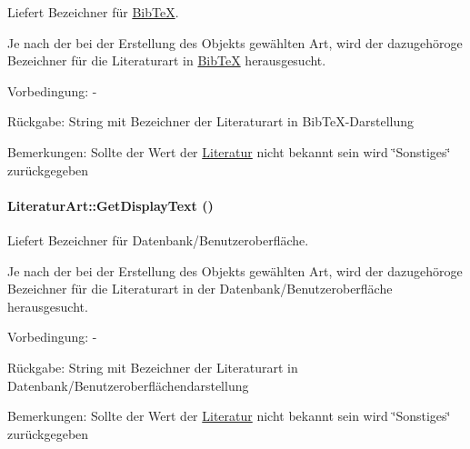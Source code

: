 Liefert Bezeichner für \hyperlink{classBibTeX}{Bib\-Te\-X}. 

Je nach der bei der Erstellung des Objekts gewählten Art, wird der dazugehöroge Bezeichner für die Literaturart in \hyperlink{classBibTeX}{Bib\-Te\-X} herausgesucht. \begin{Desc}
\item[Vorbedingung:]- \end{Desc}
\begin{Desc}
\item[R\"{u}ckgabe:]String mit Bezeichner der Literaturart in Bib\-Te\-X-Darstellung \end{Desc}
\begin{Desc}
\item[Bemerkungen:]Sollte der Wert der \hyperlink{classLiteratur}{Literatur} nicht bekannt sein wird \char`\"{}Sonstiges\char`\"{} zurückgegeben \end{Desc}
\hypertarget{classLiteraturArt_43f747a6c5d840a22ddcd7e46d27cba0}{
\paragraph[GetDisplayText]{\setlength{\rightskip}{0pt plus 5cm}Literatur\-Art::Get\-Display\-Text ()}\hfill}
\label{classLiteraturArt_43f747a6c5d840a22ddcd7e46d27cba0}


Liefert Bezeichner für Datenbank/Benutzeroberfläche. 

Je nach der bei der Erstellung des Objekts gewählten Art, wird der dazugehöroge Bezeichner für die Literaturart in der Datenbank/Benutzeroberfläche herausgesucht. \begin{Desc}
\item[Vorbedingung:]- \end{Desc}
\begin{Desc}
\item[R\"{u}ckgabe:]String mit Bezeichner der Literaturart in Datenbank/Benutzeroberflächendarstellung \end{Desc}
\begin{Desc}
\item[Bemerkungen:]Sollte der Wert der \hyperlink{classLiteratur}{Literatur} nicht bekannt sein wird \char`\"{}Sonstiges\char`\"{} zurückgegeben \end{Desc}
